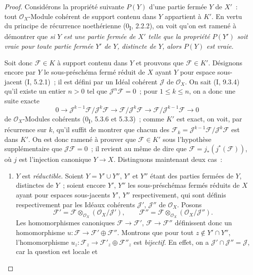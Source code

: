 \begin{proof}
Considérons la propriété suivante $P(Y)$ d'une partie fermée $Y$ de $X'$~:
tout $\mathcal O_X$-Module cohérent de support contenu dans $Y$ appartient à
$K'$. En vertu du principe de récurrence noethérienne (0\textsubscript{I},
2.2.2), on voit qu'on est ramené à démontrer que \emph{si $Y$ est une partie
fermée de $X'$ telle que la propriété $P(Y')$ soit vraie pour toute partie
fermée $Y'$ de $Y$, distincte de $Y$, alors $P(Y)$ est vraie}.

Soit donc $\mathcal F\in K$ à support contenu dans $Y$ et prouvons que
$\mathcal F\in K'$. Désignons encore par $Y$ le sous-préschéma fermé réduit de
$X$ ayant $Y$ pour espace sous-jacent (I, 5.2.1)~; il est défini par un Idéal
cohérent $\mathcal J$ de $\mathcal O_X$. On sait (I, 9.3.4) qu'il existe un
entier $n>0$ tel que $\mathcal J^n\mathcal F=0$~; pour $1\leq k\leq n$, on a
donc une suite exacte
\[
0\longrightarrow
\mathcal J^{k-1}\mathcal F/\mathcal J^k\mathcal F
\longrightarrow \mathcal F/\mathcal J^k\mathcal F
\longrightarrow \mathcal F/\mathcal J^{k-1}\mathcal F
\longrightarrow0
\]
de $\mathcal O_X$-Modules cohérents (0\textsubscript{I}, 5.3.6 et 5.3.3)~;
comme $K'$ est exact, on voit, par récurrence sur $k$, qu'il suffit de montrer
que chacun des
$\mathcal F_k=\mathcal J^{k-1}\mathcal F/\mathcal J^k\mathcal F$ est dans
$K'$. On est donc ramené à prouver que $\mathcal F\in K'$ sous l'hypothèse
supplémentaire que $\mathcal J\mathcal F=0$~; il revient au même de dire que
$\mathcal F=j_*(j^*(\mathcal F))$, où $j$ est l'injection canonique
$Y\to X$. Distinguons maintenant deux cas~:
\begin{enumerate}
\item[a)] $Y$ est \emph{réductible}. Soient $Y=Y'\cup Y''$, $Y'$ et $Y''$
étant des parties fermées de $Y$, distinctes de $Y$~; soient encore $Y'$,
$Y''$ les sous-préschémas fermés réduits de $X$ ayant pour espaces
sous-jacents $Y'$, $Y''$ respectivement, qui sont définis respectivement par
les Idéaux cohérents $\mathcal J'$, $\mathcal J''$ de $\mathcal O_X$. Posons
\[
\mathcal F'=\mathcal F\otimes_{\mathcal O_X}
(\mathcal O_X/\mathcal J'),\qquad
\mathcal F''=\mathcal F\otimes_{\mathcal O_X}
(\mathcal O_X/\mathcal J'').
\]
Les homomorphismes canoniques $\mathcal F\to\mathcal F'$,
$\mathcal F\to\mathcal F''$ définissent donc un homomorphisme
$u:\mathcal F\to\mathcal F'\oplus\mathcal F''$. Montrons que pour tout
$z\notin Y'\cap Y''$, l'homomorphisme
$u_z:\mathcal F_z\to\mathcal F'_z\oplus\mathcal F''_z$ est \emph{bijectif}.
En effet, on a $\mathcal J'\cap\mathcal J''=\mathcal J$, car la question est
locale et


\end{enumerate}
\end{proof}
